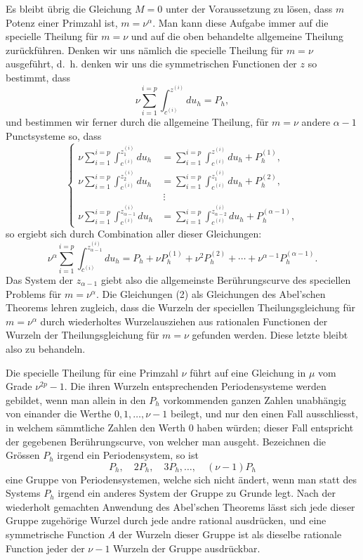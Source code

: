 \documentclass[10pt]{article}
\begin{document}
Es bleibt übrig die Gleichung \(M=0\) unter der Voraussetzung zu lösen, dass \(m\) Potenz einer Primzahl ist, \(m=\nu^\alpha\). Man kann diese Aufgabe immer auf die specielle Theilung für \(m=\nu\) und auf die oben behandelte allgemeine Theilung zurückführen. Denken wir uns nämlich die specielle Theilung für \(m=\nu\) ausgeführt, d.~h. denken wir uns die symmetrischen Functionen der \(z\) so bestimmt, dass
\[
\nu\sum_{i=1}^{i=p}\int_{c^{(i)}}^{z^{(i)}}du_h=P_h,
\]
und bestimmen wir ferner durch die allgemeine Theilung, für \(m=\nu\) andere \(\alpha-1\) Punctsysteme so, dass
\[
\left\{
\begin{aligned}
\nu\sum_{i=1}^{i=p}\int_{c^{(i)}}^{z_1^{(i)}}du_h
&=
\sum_{i=1}^{i=p}\int_{c^{(i)}}^{z^{(i)}}du_h+P_h^{(1)},\\
\nu\sum_{i=1}^{i=p}\int_{c^{(i)}}^{z_2^{(i)}}du_h
&=
\sum_{i=1}^{i=p}\int_{c^{(i)}}^{z_1^{(i)}}du_h+P_h^{(2)},\\
&\ \vdots\\
\nu\sum_{i=1}^{i=p}\int_{c^{(i)}}^{z_{\alpha-1}^{(i)}}du_h
&=
\sum_{i=1}^{i=p}\int_{c^{(i)}}^{z_{\alpha-2}^{(i)}}du_h+P_h^{(\alpha-1)},
\end{aligned}
\right.
\tag{2}
\]
so ergiebt sich durch Combination aller dieser Gleichungen:
\[
\nu^\alpha\sum_{i=1}^{i=p}\int_{c^{(i)}}^{z_{\alpha-1}^{(i)}}du_h
=
P_h+\nu P_h^{(1)}+\nu^2P_h^{(2)}+\cdots+\nu^{\alpha-1}P_h^{(\alpha-1)}.
\]
Das System der \(z_{\alpha-1}\) giebt also die allgemeinste Berührungscurve des speciellen Problems für \(m=\nu^\alpha\). Die Gleichungen (2) als Gleichungen des Abel'schen Theorems lehren zugleich, dass die Wurzeln der speciellen Theilungsgleichung für \(m=\nu^\alpha\) durch wiederholtes Wurzelausziehen aus rationalen Functionen der Wurzeln der Theilungsgleichung für \(m=\nu\) gefunden werden. Diese letzte bleibt also zu behandeln.

Die specielle Theilung für eine Primzahl \(\nu\) führt auf eine Gleichung in \(\mu\) vom Grade \(\nu^{2p}-1\). Die ihren Wurzeln entsprechenden Periodensysteme werden gebildet, wenn man allein in den \(P_h\) vorkommenden ganzen Zahlen unabhängig von einander die Werthe \(0,1,\ldots,\nu-1\) beilegt, und nur den einen Fall ausschliesst, in welchem sämmtliche Zahlen den Werth 0 haben würden; dieser Fall entspricht der gegebenen Berührungscurve, von welcher man ausgeht. Bezeichnen die Grössen \(P_h\) irgend ein Periodensystem, so ist
\[
P_h,\quad 2P_h,\quad 3P_h,\ldots,\quad(\nu-1)P_h
\]
eine Gruppe von Periodensystemen, welche sich nicht ändert, wenn man statt des Systems \(P_h\) irgend ein anderes System der Gruppe zu Grunde legt. Nach der wiederholt gemachten Anwendung des Abel'schen Theorems lässt sich jede dieser Gruppe zugehörige Wurzel durch jede andre rational ausdrücken, und eine symmetrische Function \(A\) der Wurzeln dieser Gruppe ist als dieselbe rationale Function jeder der \(\nu-1\) Wurzeln der Gruppe ausdrückbar.
\end{document}
